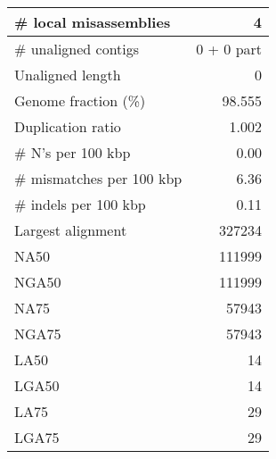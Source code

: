 \documentclass[12pt,a4paper]{article}
\begin{document}
\begin{table}[ht]
\begin{center}
\begin{tabular}{|l*{1}{|r}|}
\# local misassemblies & 4 \\ \hline
\# unaligned contigs & 0 + 0 part \\ \hline
Unaligned length & 0 \\ \hline
Genome fraction (\%) & 98.555 \\ \hline
Duplication ratio & 1.002 \\ \hline
\# N's per 100 kbp & 0.00 \\ \hline
\# mismatches per 100 kbp & 6.36 \\ \hline
\# indels per 100 kbp & 0.11 \\ \hline
Largest alignment & 327234 \\ \hline
NA50 & 111999 \\ \hline
NGA50 & 111999 \\ \hline
NA75 & 57943 \\ \hline
NGA75 & 57943 \\ \hline
LA50 & 14 \\ \hline
LGA50 & 14 \\ \hline
LA75 & 29 \\ \hline
LGA75 & 29 \\ \hline
\end{tabular}
\end{center}
\end{table}
\end{document}
